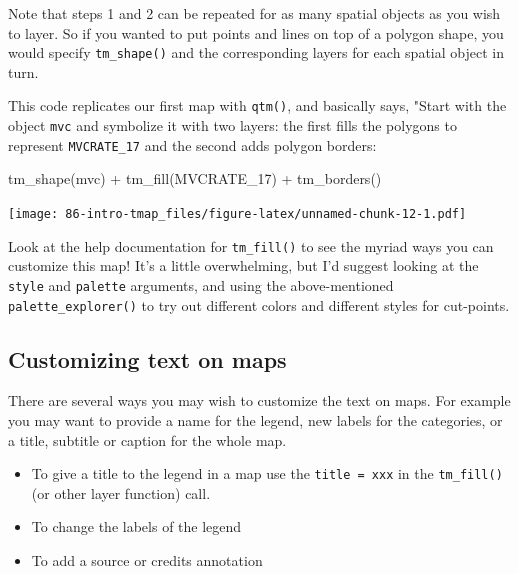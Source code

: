 \documentclass[
]{book}
\newenvironment{Shaded}{\begin{snugshade}}{\end{snugshade}}
\newcommand{\FunctionTok}[1]{\textcolor[rgb]{0.00,0.00,0.00}{#1}}
\newcommand{\NormalTok}[1]{#1}
\newcommand{\SpecialCharTok}[1]{\textcolor[rgb]{0.00,0.00,0.00}{#1}}
\newcommand{\StringTok}[1]{\textcolor[rgb]{0.31,0.60,0.02}{#1}}
\providecommand{\tightlist}{%
  \setlength{\itemsep}{0pt}\setlength{\parskip}{0pt}}
\begin{document}
Note that steps 1 and 2 can be repeated for as many spatial objects as you wish to layer. So if you wanted to put points and lines on top of a polygon shape, you would specify \texttt{tm\_shape()} and the corresponding layers for each spatial object in turn.

This code replicates our first map with \texttt{qtm()}, and basically says, "Start with the object \texttt{mvc} and symbolize it with two layers: the first fills the polygons to represent \texttt{MVCRATE\_17} and the second adds polygon borders:

\begin{Shaded}
\begin{Highlighting}[]
\FunctionTok{tm\_shape}\NormalTok{(mvc) }\SpecialCharTok{+}
  \FunctionTok{tm\_fill}\NormalTok{(}\StringTok{\textquotesingle{}MVCRATE\_17\textquotesingle{}}\NormalTok{) }\SpecialCharTok{+}
  \FunctionTok{tm\_borders}\NormalTok{()}
\end{Highlighting}
\end{Shaded}

\texttt{[image: 86-intro-tmap\_files/figure-latex/unnamed-chunk-12-1.pdf]}

Look at the help documentation for \texttt{tm\_fill()} to see the myriad ways you can customize this map! It's a little overwhelming, but I'd suggest looking at the \texttt{style} and \texttt{palette} arguments, and using the above-mentioned \texttt{palette\_explorer()} to try out different colors and different styles for cut-points.

\hypertarget{customizing-text-on-maps}{%
\subsection{Customizing text on maps}\label{customizing-text-on-maps}}

There are several ways you may wish to customize the text on maps. For example you may want to provide a name for the legend, new labels for the categories, or a title, subtitle or caption for the whole map.

\begin{itemize}
\tightlist
\item
  To give a title to the legend in a map use the \texttt{title\ =\ \textquotesingle{}xxx\textquotesingle{}} in the \texttt{tm\_fill()} (or other layer function) call.
\item
  To change the labels of the legend
\item
  To add a source or credits annotation
\end{itemize}
\end{document}
